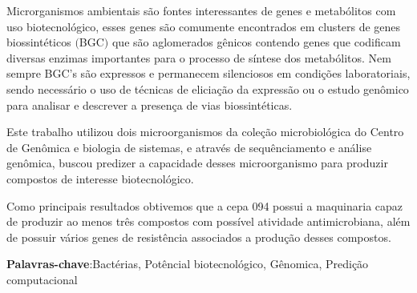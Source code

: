 \setlength{\absparsep}{18pt} %
\begin{resumo}
Microrganismos ambientais são fontes interessantes de genes e metabólitos
com uso biotecnológico, esses genes são comumente encontrados em clusters de genes biossintéticos $($BGC$)$
que são aglomerados gênicos contendo genes que codificam diversas enzimas importantes
para o processo de síntese dos metabólitos. Nem sempre BGC's são expressos e permanecem 
silenciosos em condições laboratoriais, sendo necessário o uso de técnicas de eliciação
da expressão ou o estudo genômico para analisar e descrever a presença de vias biossintéticas.

Este trabalho utilizou dois microorganismos da coleção microbiológica do
Centro de Genômica e biologia de sistemas, e através de sequênciamento
e análise genômica, buscou predizer a capacidade desses microorganismo
para produzir  compostos de interesse biotecnológico.

Como principais resultados obtivemos que a cepa 094 possui a maquinaria
capaz de produzir ao menos três compostos com possível atividade antimicrobiana, 
além de possuir vários genes de resistência associados a produção desses compostos.

\textbf{Palavras-chave}:Bactérias, Potêncial biotecnológico, Gênomica, Predição computacional
\end{resumo}

%
% 

% 

%  
